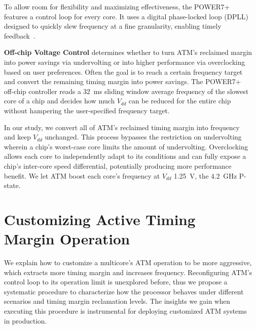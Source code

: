 To allow room for flexibility and maximizing effectiveness, the POWER7+ features a control loop for every core. It uses a digital phase-locked loop (DPLL) designed to quickly slew frequency at a fine granularity, enabling timely feedback~\cite{tierno2010dpll,lefurgy2011active}.

\textbf{Off-chip Voltage Control} determines whether to turn ATM's reclaimed margin into power savings via undervolting or into higher performance via overclocking based on user preferences. Often the goal is to reach a certain frequency target and convert the remaining timing margin into power savings. The POWER7+ off-chip controller reads a 32~ms sliding window average frequency of the slowest core of a chip and decides how much $V_{dd}$ can be reduced for the entire chip without hampering the user-specified frequency target.

In our study, we convert all of ATM's reclaimed timing margin into frequency and keep $V_{dd}$ unchanged. This process bypasses the restriction on undervolting wherein a chip's worst-case core limits the amount of undervolting. Overclocking allows each core to independently adapt to its conditions and can fully expose a chip's inter-core speed differential, potentially producing more performance benefit. We let ATM boost each core's frequency at $V_{dd}$ 1.25~V, the 4.2~GHz P-state.

\section{Customizing Active Timing \\Margin Operation}
\label{sec:process:configurability}

We explain how to customize a multicore's ATM operation to be more aggressive, which extracts more timing margin and increases frequency. Reconfiguring ATM's control loop to its operation limit is unexplored before, thus we propose a systematic procedure to characterize how the processor behaves under different scenarios and timing margin reclamation levels. The insights we gain when executing this procedure is instrumental for deploying customized ATM systems in production.


